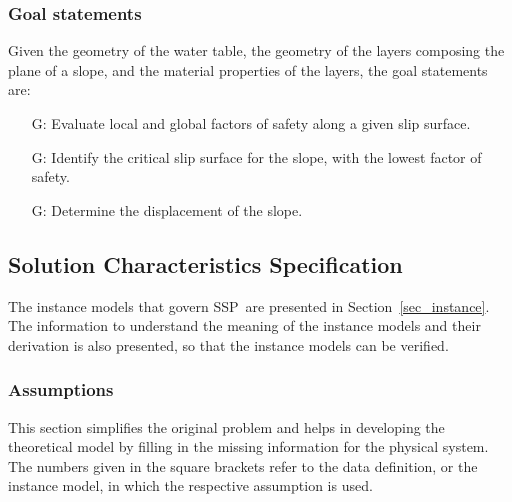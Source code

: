 \documentclass[12pt]{article}
\newcommand{\progname}{SSP}
\newcounter{goalnum} %
\begin{document}
\subsubsection{Goal statements}

Given the geometry of the water table, the geometry of the layers
composing the plane of a slope, and the material properties of the
layers, the goal statements are:

\begin{itemize}
\item [G\refstepcounter{goalnum}\thegoalnum: \label{G_FS}]
  {Evaluate local and global factors of safety along a given slip
    surface.}
  
\item [G\refstepcounter{goalnum}\thegoalnum: \label{G_Critical}]
  {Identify the critical slip surface for the slope, with the lowest
    factor of safety.}
  
\item [G\refstepcounter{goalnum}\thegoalnum: \label{G_Displacement}]
  {Determine the displacement of the slope.}
\end{itemize}

\subsection{Solution Characteristics Specification}

The instance models that govern \progname\ are presented in
Section~\ref{sec_instance}.  The information to understand the
meaning of the instance models and their derivation is also presented,
so that the instance models can be verified.

\subsubsection{Assumptions}
\label{Assumptions}
This section simplifies the original problem and helps in developing
the theoretical model by filling in the missing information for the
physical system.
The numbers given in the square brackets refer to the data definition, or the instance model, in which the respective
 assumption is used.
\end{document}
